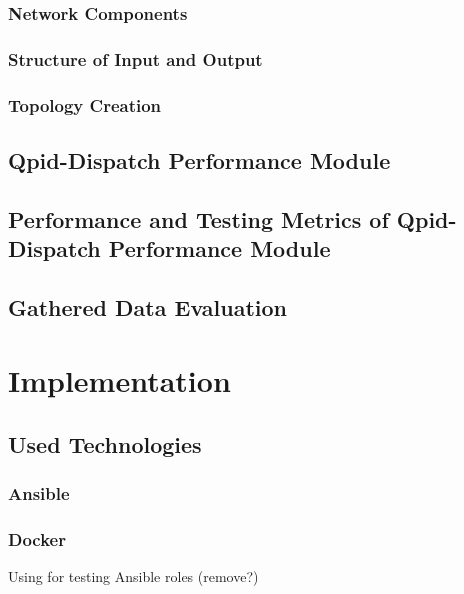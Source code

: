 \subsection{Network Components}

\subsection{Structure of Input and Output}

\subsection{Topology Creation}

\section{Qpid-Dispatch Performance Module}

\subsection{}

\section{Performance and Testing Metrics of Qpid-Dispatch Performance Module}

\section{Gathered Data Evaluation}

\chapter{Implementation}
\label{Implementation}

\section{Used Technologies}

\subsection{Ansible}

\subsection{Docker}
Using for testing Ansible roles (remove?)

